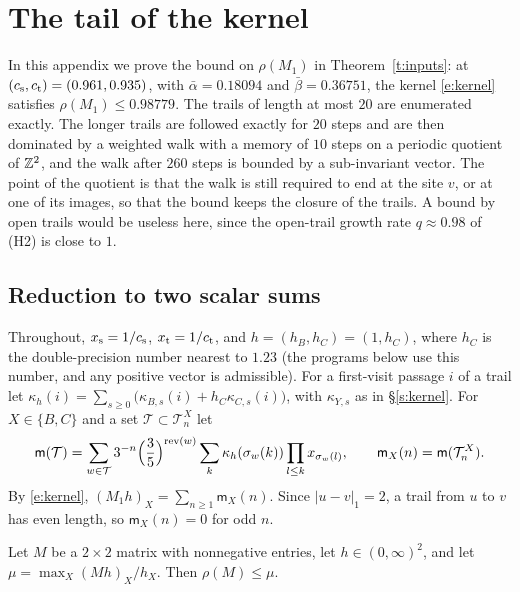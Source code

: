 \section{The tail of the kernel}\label{s:tail}

In this appendix we prove the bound on $\rho(M_1)$ in Theorem~\ref{t:inputs}: at $(c_{\mathrm{s}}, c_{\mathrm{t}}) = (0.961, 0.935)$, with $\bar\alpha = 0.18094$ and $\bar\beta = 0.36751$, the kernel \eqref{e:kernel} satisfies $\rho(M_1) \le 0.98779$. The trails of length at most $20$ are enumerated exactly. The longer trails are followed exactly for $20$ steps and are then dominated by a weighted walk with a memory of $10$ steps on a periodic quotient of $\mathbb{Z}^2$, and the walk after $260$ steps is bounded by a sub-invariant vector. The point of the quotient is that the walk is still required to end at the site $v$, or at one of its images, so that the bound keeps the closure of the trails. A bound by open trails would be useless here, since the open-trail growth rate $q \approx 0.98$ of (H2) is close to $1$.

\subsection{Reduction to two scalar sums}\label{s:tailred}

Throughout, $x_{\mathrm s} = 1/c_{\mathrm{s}}$, $x_{\mathrm t} = 1/c_{\mathrm{t}}$, and $h = (h_B, h_C) = (1, h_C)$, where $h_C$ is the double-precision number nearest to $1.23$ (the programs below use this number, and any positive vector is admissible). For a first-visit passage $i$ of a trail let $\kappa_h(i) = \sum_{s \ge 0} \bigl( \kappa_{B, s}(i) + h_C \kappa_{C, s}(i) \bigr)$, with $\kappa_{Y, s}$ as in \S\ref{s:kernel}. For $X \in \{B, C\}$ and a set $\mathcal T \subset \mathcal T^X_n$ let
\begin{equation}\label{e:mT}
\mathsf m(\mathcal T) = \sum_{w \in \mathcal T} 3^{-n} \Bigl( \frac35 \Bigr)^{\mathrm{rev}(w)} \sum_k \kappa_h(\sigma_w(k)) \prod_{l \le k} x_{\sigma_w(l)}, \qquad \mathsf m_X(n) = \mathsf m(\mathcal T^X_n).
\end{equation}
By \eqref{e:kernel}, $(M_1 h)_X = \sum_{n \ge 1} \mathsf m_X(n)$. Since $|u - v|_1 = 2$, a trail from $u$ to $v$ has even length, so $\mathsf m_X(n) = 0$ for odd $n$.

\begin{lemma}\label{l:CW}
Let $M$ be a $2 \times 2$ matrix with nonnegative entries, let $h \in (0, \infty)^2$, and let $\mu = \max_X (M h)_X / h_X$. Then $\rho(M) \le \mu$.
\end{lemma}

